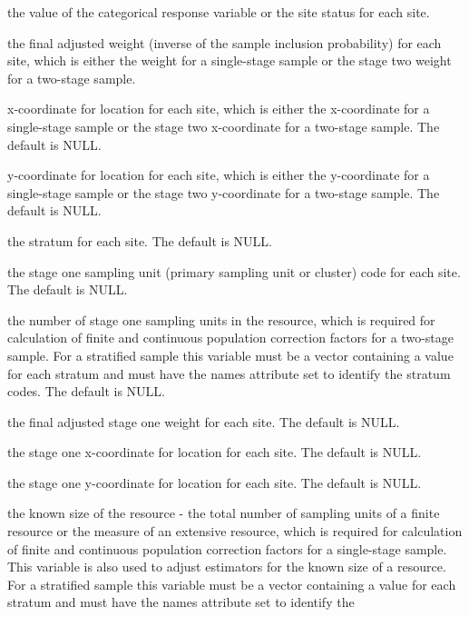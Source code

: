 \begin{Arguments}
\begin{ldescription}
\item[\code{catvar}] the value of the categorical response variable or the site
status for each site.
\item[\code{wgt}] the final adjusted weight (inverse of the sample inclusion
probability) for each site, which is either the weight for a 
single-stage sample or the stage two weight for a two-stage sample.
\item[\code{x}] x-coordinate for location for each site, which is either the
x-coordinate for a single-stage sample or the stage two 
x-coordinate for a two-stage sample.  The default is NULL.
\item[\code{y}] y-coordinate for location for each site, which is either the
y-coordinate for a single-stage sample or the stage two 
y-coordinate for a two-stage sample.  The default is NULL.
\item[\code{stratum}] the stratum for each site.  The default is NULL.
\item[\code{cluster}] the stage one sampling unit (primary sampling unit or cluster) 
code for each site.  The default is NULL.
\item[\code{N.cluster}] the number of stage one sampling units in the resource, which 
is required for calculation of finite and continuous population 
correction factors for a two-stage sample.  For a stratified sample 
this variable must be a vector containing a value for each stratum and
must have the names attribute set to identify the stratum codes.  The
default is NULL.
\item[\code{wgt1}] the final adjusted stage one weight for each site.  The default
is NULL.
\item[\code{x1}] the stage one x-coordinate for location for each site.  The default
is NULL.
\item[\code{y1}] the stage one y-coordinate for location for each site.  The default
is NULL.
\item[\code{popsize}] the known size of the resource - the total number of sampling 
units of a finite resource or the measure of an extensive resource,
which is required for calculation of finite and continuous population 
correction factors for a single-stage sample.  This variable is also 
used to adjust estimators for the known size of a resource.  For a
stratified sample this variable must be a vector containing a value 
for each stratum and must have the names attribute set to identify the

\end{ldescription}
\end{Arguments}
